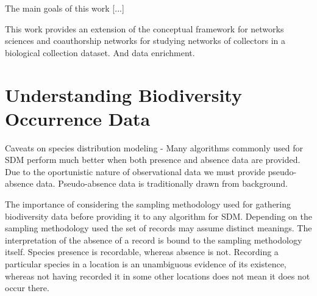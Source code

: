 \documentclass[a4paper]{article}
\begin{document}
The main goals of this work [...]



This work provides an extension of the conceptual framework for networks sciences and coauthorship networks for studying networks of collectors in a biological collection dataset. And data enrichment. 
 

\section{Understanding Biodiversity Occurrence Data}


    


Caveats on species distribution modeling
  - Many algorithms commonly used for SDM perform much better when both presence and absence data are provided. Due to the oportunistic nature of observational data we must provide pseudo-absence data. Pseudo-absence data is traditionally drawn from background. 

The importance of considering the sampling methodology used for gathering biodiversity data before providing it to any algorithm for SDM.
Depending on the sampling methodology used the set of records may assume distinct meanings.
The interpretation of the absence of a record is bound to the sampling methodology itself. 
Species presence is recordable, whereas absence is not.
Recording a particular species in a location is an unambiguous evidence of its existence, whereas not having recorded it in some other locations does not mean it does not occur there.
\end{document}

